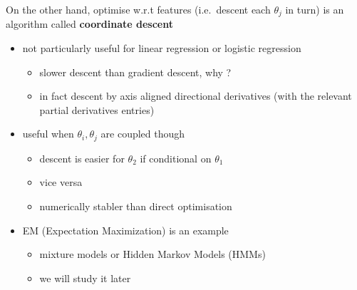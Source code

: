 \documentclass[ignorenonframetext,aspectratio=169]{beamer}
\providecommand{\tightlist}{%
  \setlength{\itemsep}{0pt}\setlength{\parskip}{0pt}}
\newcommand{\empha}[1]{\textbf{\textcolor{stablue}{#1}}}
\begin{document}
\begin{frame}{}
\protect\hypertarget{section-1}{}

On the other hand, optimise w.r.t features (i.e.~descent each
\(\theta_j\) in turn) is an algorithm called \empha{coordinate descent}

\begin{itemize}
\tightlist
\item
  not particularly useful for linear regression or logistic regression

  \begin{itemize}
  \tightlist
  \item
    slower descent than gradient descent, why ?
  \item
    in fact descent by axis aligned directional derivatives (with the
    relevant partial derivatives entries)
  \end{itemize}
\item
  useful when \(\theta_i, \theta_j\) are coupled though

  \begin{itemize}
  \tightlist
  \item
    descent is easier for \(\theta_2\) if conditional on \(\theta_1\)
  \item
    vice versa
  \item
    numerically stabler than direct optimisation
  \end{itemize}
\item
  EM (Expectation Maximization) is an example

  \begin{itemize}
  \tightlist
  \item
    mixture models or Hidden Markov Models (HMMs)
  \item
    we will study it later
  \end{itemize}
\end{itemize}

\end{frame}
\end{document}
